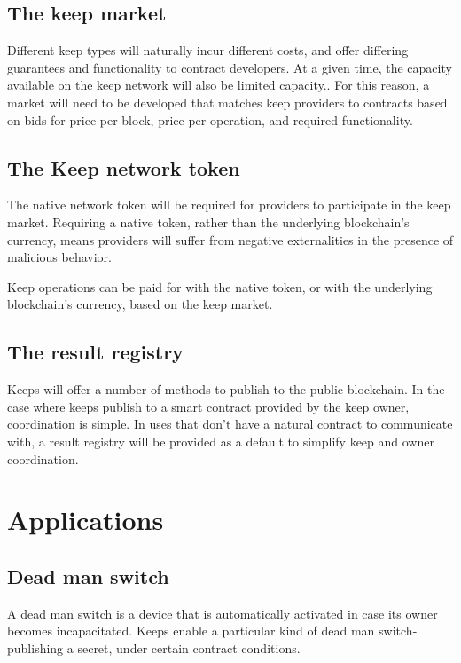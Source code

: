 \documentclass[11pt]{article}
\begin{document}
\subsection{The keep market}

Different keep types will naturally incur different costs, and offer
differing guarantees and functionality to contract developers. At a
given time, the capacity available on the keep network will also be
limited capacity.. For this reason, a market will need to be developed
that matches keep providers to contracts based on bids for price per
block, price per operation, and required functionality.

\subsection{The Keep network token}

The native network token will be required for providers to participate
in the keep market. Requiring a native token, rather than the
underlying blockchain’s currency, means providers will suffer from
negative externalities in the presence of malicious behavior.

Keep operations can be paid for with the native token, or with the
underlying blockchain’s currency, based on the keep market.

\subsection{The result registry}

Keeps will offer a number of methods to publish to the public
blockchain. In the case where keeps publish to a smart contract
provided by the keep owner, coordination is simple. In uses that don’t
have a natural contract to communicate with, a result registry will be
provided as a default to simplify keep and owner coordination.

\section{Applications}

\subsection{Dead man switch}

A dead man switch is a device that is automatically activated in case
its owner becomes incapacitated. Keeps enable a particular kind of
dead man switch- publishing a secret, under certain contract
conditions.
\end{document}
